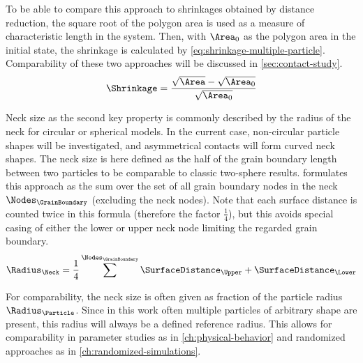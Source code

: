 To be able to compare this approach to shrinkages obtained by distance reduction, the square root of the polygon area is used as a measure of characteristic length in the system.
Then, with $\Area_0$ as the polygon area in the initial state, the shrinkage is calculated by \cref{eq:shrinkage-multiple-particle}.
Comparability of these two approaches will be discussed in \cref{sec:contact-study}.
\begin{equation}
    \Shrinkage = \frac{\sqrt{\Area} - \sqrt{\Area_0}}{\sqrt{\Area_0}}
    \label{eq:shrinkage-multiple-particle}
\end{equation}

Neck size as the second key property is commonly described by the radius of the neck for circular or spherical models.
In the current case, non-circular particle shapes will be investigated, and asymmetrical contacts will form curved neck shapes.
The neck size is here defined as the half of the grain boundary length between two particles to be comparable to classic two-sphere results.
 formulates this approach as the sum over the set of all grain boundary nodes in the neck $\Nodes_{\GrainBoundary}$ (excluding the neck nodes).
Note that each surface distance is counted twice in this formula (therefore the factor $\frac14$), but this avoids special casing of either the lower or upper neck node limiting the regarded grain boundary.
\begin{equation}
    \Radius_{\Neck} = \frac14 \sum^{\Nodes_{\GrainBoundary}} \SurfaceDistance_{\Upper} + \SurfaceDistance_{\Lower}
    \label{eq:neck-size}
\end{equation}

For comparability, the neck size is often given as fraction of the particle radius $\Radius_{\Particle}$.
Since in this work often multiple particles of arbitrary shape are present, this radius will always be a defined reference radius.
This allows for comparability in parameter studies as in \cref{ch:physical-behavior} and randomized approaches as in \cref{ch:randomized-simulations}.
